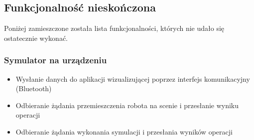 \documentclass[a4paper,12pt]{article}
\begin{document}
\subsection{Funkcjonalność nieskończona}
Poniżej zamieszczone została lista funkcjonalności, których nie udało się ostatecznie wykonać.
\subsubsection{Symulator na urządzeniu}
\begin{itemize}
\item Wysłanie danych do aplikacji wizualizującej poprzez interfejs komunikacyjny (Bluetooth)
\item Odbieranie żądania przemieszczenia robota na scenie i przesłanie wyniku operacji
\item Odbieranie żądania wykonania symulacji i przesłania wyników operacji
\end{itemize}
\end{document}
